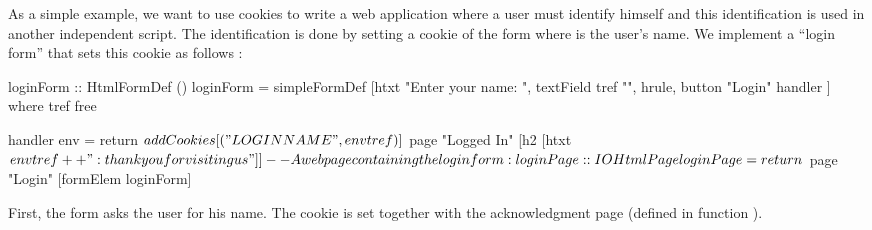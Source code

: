 As a simple example, we want to use cookies to write a web application
where a user must identify himself and this identification is used
in another independent script. The identification is done
by setting a cookie of the form 
where  is the user's name.
We implement a ``login form'' that sets this cookie as follows
:
%
\begin{curry}
loginForm :: HtmlFormDef ()
loginForm = simpleFormDef
  [htxt "Enter your name: ", textField tref "",
   hrule,
   button "Login" handler
  ]
 where
   tref free

   handler env = return $
     addCookies [("LOGINNAME", env tref)] $
       page "Logged In"
            [h2 [htxt $ env tref ++ ": thank you for visiting us"]]

-- A web page containing the login form:
loginPage :: IO HtmlPage
loginPage = return $ page "Login" [formElem loginForm]
\end{curry}
%
First, the form asks the user for his name.
The cookie is set together with the acknowledgment page
(defined in function ).

